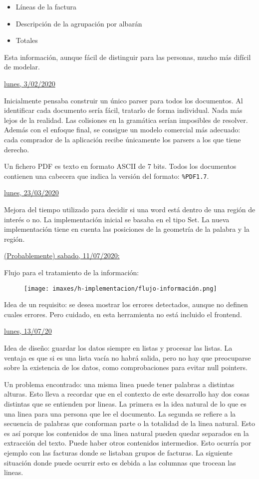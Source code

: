 \begin{itemize}
    \item Líneas de la factura
    \item Descripción de la agrupación por albarán
    \item Totales
\end{itemize}

Esta información, aunque fácil de distinguir para las personas, mucho más difícil de modelar.

\underline{lunes, 3/02/2020}

Inicialmente pensaba construir un único parser para todos los documentos. Al identificar cada documento sería fácil, tratarlo de forma individual. Nada más lejos de la realidad. Las colisiones en la gramática serían imposibles de resolver. Además con el enfoque final, se consigue un modelo comercial más adecuado: cada comprador de la aplicación recibe únicamente los parsers a los que tiene derecho.

Un fichero PDF es texto en formato ASCII de 7 bits. Todos los documentos contienen una cabecera que indica la versión del formato: \verb|%PDF1.7|.

\underline{lunes, 23/03/2020}

Mejora del tiempo utilizado para decidir si una word está dentro de una región de interés o no. La implementación inicial se basaba en el tipo Set. La nueva implementación tiene en cuenta las posiciones de la geometría de la palabra y la región.

\underline{(Probablemente) sabado, 11/07/2020:}

Flujo para el tratamiento de la información:

\begin{figure}[hp!]
  \centering
  \texttt{[image: imaxes/h-implementacion/flujo-información.png]}
\end{figure}

Idea de un requisito: se desea mostrar los errores detectados, aunque no definen cuales errores. Pero cuidado, en esta herramienta no está incluido el frontend.

\underline{lunes, 13/07/20}

Idea de diseño: guardar los datos siempre en listas y procesar las listas. La ventaja es que si es una lista vacía no habrá salida, pero no hay que preocuparse sobre la existencia de los datos, como comprobaciones para evitar null pointers.

Un problema encontrado: una misma linea puede tener palabras a distintas alturas. Esto lleva a recordar que en el contexto de este desarrollo hay dos cosas distintas que se entienden por lineas. La primera es la idea natural de lo que es una linea para una persona que lee el documento. La segunda se refiere a la secuencia de palabras que conforman parte o la totalidad de la linea natural. Esto es así porque los contenidos de una linea natural pueden quedar separados en la extracción del texto. Puede haber otros contenidos intermedios. Esto ocurría por ejemplo con las facturas donde se listaban grupos de facturas. La siguiente situación donde puede ocurrir esto es debida a las columnas que trocean las lineas.

